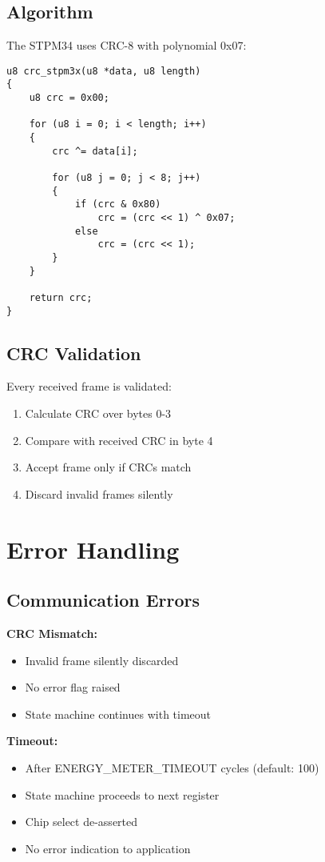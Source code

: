 \documentclass[11pt,a4paper]{article}
\begin{document}
\subsection{Algorithm}

The STPM34 uses CRC-8 with polynomial 0x07:

\begin{lstlisting}
u8 crc_stpm3x(u8 *data, u8 length)
{
    u8 crc = 0x00;

    for (u8 i = 0; i < length; i++)
    {
        crc ^= data[i];

        for (u8 j = 0; j < 8; j++)
        {
            if (crc & 0x80)
                crc = (crc << 1) ^ 0x07;
            else
                crc = (crc << 1);
        }
    }

    return crc;
}
\end{lstlisting}

\subsection{CRC Validation}

Every received frame is validated:
\begin{enumerate}[noitemsep]
    \item Calculate CRC over bytes 0-3
    \item Compare with received CRC in byte 4
    \item Accept frame only if CRCs match
    \item Discard invalid frames silently
\end{enumerate}

\section{Error Handling}

\subsection{Communication Errors}

\textbf{CRC Mismatch:}
\begin{itemize}[noitemsep]
    \item Invalid frame silently discarded
    \item No error flag raised
    \item State machine continues with timeout
\end{itemize}

\textbf{Timeout:}
\begin{itemize}[noitemsep]
    \item After ENERGY\_METER\_TIMEOUT cycles (default: 100)
    \item State machine proceeds to next register
    \item Chip select de-asserted
    \item No error indication to application
\end{itemize}
\end{document}

